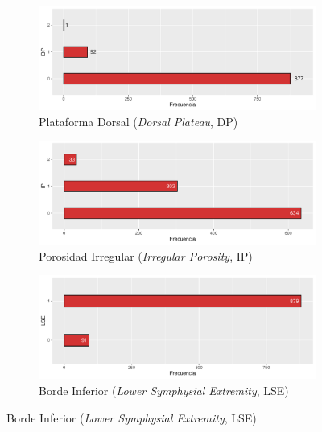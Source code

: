 \begin{figure}
    \ContinuedFloat

    \begin{subfigure}{\textwidth}
        \includegraphics[width=\linewidth]{../../scripts/eda/eda_univar/char_dp_distr.pdf}
        \caption{Plataforma Dorsal (\textit{Dorsal Plateau}, DP)}
        \label{fig4:todd_chars__dp}
    \end{subfigure}

    \begin{subfigure}{\textwidth}
        \includegraphics[width=\linewidth]{../../scripts/eda/eda_univar/char_ip_distr.pdf}
        \caption{Porosidad Irregular (\textit{Irregular Porosity}, IP)}
        \label{fig4:todd_chars__ip}
    \end{subfigure}

    \begin{subfigure}{\textwidth}
        \includegraphics[width=\linewidth]{../../scripts/eda/eda_univar/char_lse_distr.pdf}
        \caption{Borde Inferior (\textit{Lower Symphysial Extremity}, LSE)}
        \label{fig4:todd_chars__lse}
    \end{subfigure}

    \label{fig4:todd_chars}
\end{figure}
